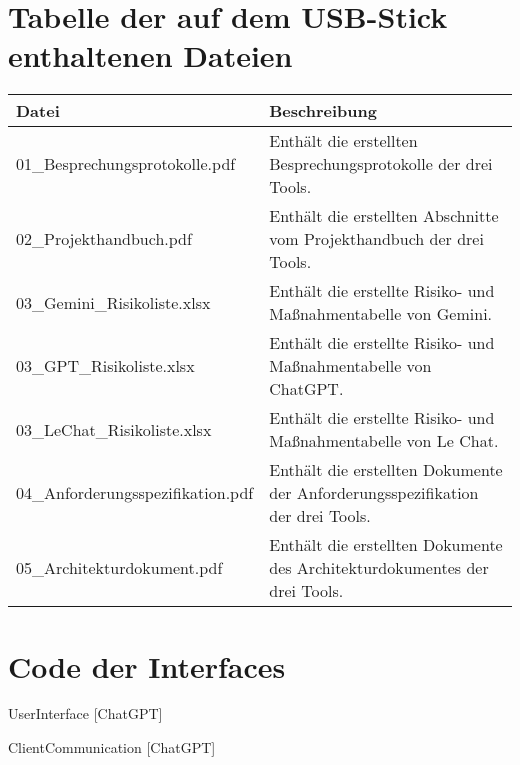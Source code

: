 \clearpage

\section*{Tabelle der auf dem USB-Stick enthaltenen Dateien} \label{BeigelegteDateien}

\begin{longtable}{|p{6cm}|p{9cm}|}
    \hline
    \textbf{Datei} & \textbf{Beschreibung} \\
    \hline
    \endfirsthead

    01\_Besprechungsprotokolle.pdf & Enthält die erstellten Besprechungsprotokolle der drei Tools. \\
    \hline
    02\_Projekthandbuch.pdf & Enthält die erstellten Abschnitte vom Projekthandbuch der drei Tools. \\
    \hline
    03\_Gemini\_Risikoliste.xlsx & Enthält die erstellte Risiko- und Maßnahmentabelle von Gemini. \\
    \hline
    03\_GPT\_Risikoliste.xlsx & Enthält die erstellte Risiko- und Maßnahmentabelle von ChatGPT. \\
    \hline
    03\_LeChat\_Risikoliste.xlsx & Enthält die erstellte Risiko- und Maßnahmentabelle von Le Chat. \\
    \hline
    04\_Anforderungsspezifikation.pdf & Enthält die erstellten Dokumente der Anforderungsspezifikation der drei Tools. \\
    \hline
    05\_Architekturdokument.pdf & Enthält die erstellten Dokumente des Architekturdokumentes der drei Tools. \\
    \hline

\end{longtable}

\section*{Code der Interfaces} \label{Interfaces}

\begin{Code}[H]
    
    \vfill
\caption{UserInterface [ChatGPT]}
\label{Code UserInterface}
\end{Code}

\begin{Code}[H]
    
    \vfill
\caption{ClientCommunication [ChatGPT]}
\label{Code ClientCommunication}
\end{Code}

